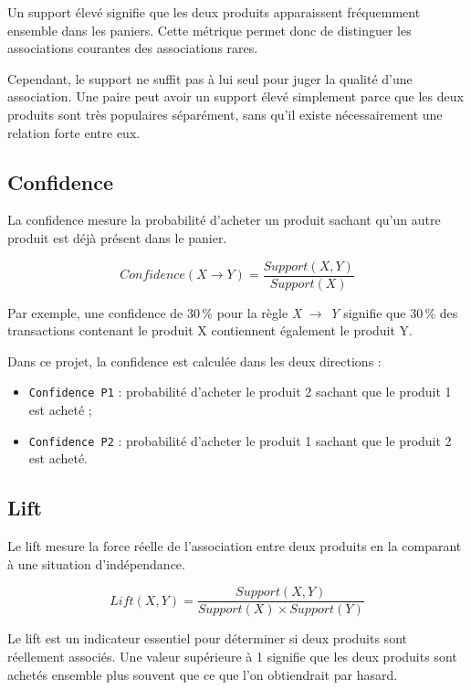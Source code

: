 \documentclass[12pt,a4paper,twoside]{report}
\begin{document}
Un support élevé signifie que les deux produits apparaissent fréquemment ensemble dans les paniers. Cette métrique permet donc de distinguer les associations courantes des associations rares.

Cependant, le support ne suffit pas à lui seul pour juger la qualité d'une association. Une paire peut avoir un support élevé simplement parce que les deux produits sont très populaires séparément, sans qu'il existe nécessairement une relation forte entre eux.

\subsection{Confidence}

La confidence mesure la probabilité d'acheter un produit sachant qu'un autre produit est déjà présent dans le panier.

\[
Confidence(X \rightarrow Y) = \frac{Support(X,Y)}{Support(X)}
\]

Par exemple, une confidence de 30\,\% pour la règle \textit{X} $\rightarrow$ \textit{Y} signifie que 30\,\% des transactions contenant le produit X contiennent également le produit Y.

Dans ce projet, la confidence est calculée dans les deux directions :
\begin{itemize}
  \item \texttt{Confidence P1} : probabilité d'acheter le produit 2 sachant que le produit 1 est acheté ;
  \item \texttt{Confidence P2} : probabilité d'acheter le produit 1 sachant que le produit 2 est acheté.
\end{itemize}

\subsection{Lift}

Le lift mesure la force réelle de l'association entre deux produits en la comparant à une situation d'indépendance.

\[
Lift(X,Y) = \frac{Support(X,Y)}{Support(X) \times Support(Y)}
\]

Le lift est un indicateur essentiel pour déterminer si deux produits sont réellement associés. Une valeur supérieure à 1 signifie que les deux produits sont achetés ensemble plus souvent que ce que l'on obtiendrait par hasard.
\end{document}
